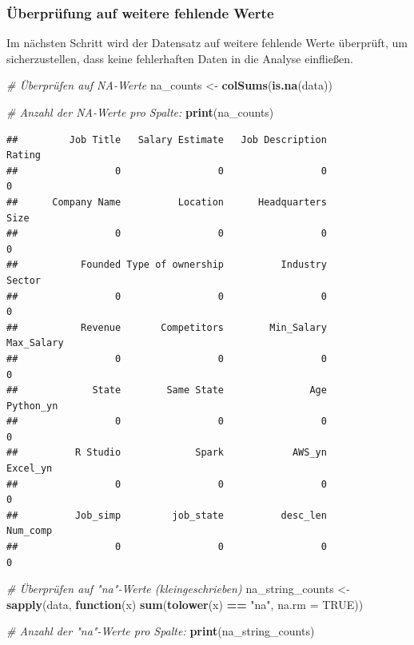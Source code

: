 \documentclass[
]{article}
\newenvironment{Shaded}{\begin{snugshade}}{\end{snugshade}}
\newcommand{\AttributeTok}[1]{\textcolor[rgb]{0.13,0.29,0.53}{#1}}
\newcommand{\CommentTok}[1]{\textcolor[rgb]{0.56,0.35,0.01}{\textit{#1}}}
\newcommand{\ConstantTok}[1]{\textcolor[rgb]{0.56,0.35,0.01}{#1}}
\newcommand{\ControlFlowTok}[1]{\textcolor[rgb]{0.13,0.29,0.53}{\textbf{#1}}}
\newcommand{\FunctionTok}[1]{\textcolor[rgb]{0.13,0.29,0.53}{\textbf{#1}}}
\newcommand{\NormalTok}[1]{#1}
\newcommand{\OtherTok}[1]{\textcolor[rgb]{0.56,0.35,0.01}{#1}}
\newcommand{\SpecialCharTok}[1]{\textcolor[rgb]{0.81,0.36,0.00}{\textbf{#1}}}
\newcommand{\StringTok}[1]{\textcolor[rgb]{0.31,0.60,0.02}{#1}}
\begin{document}
\subsubsection{Überprüfung auf weitere fehlende
Werte}\label{uxfcberpruxfcfung-auf-weitere-fehlende-werte}

Im nächsten Schritt wird der Datensatz auf weitere fehlende Werte
überprüft, um sicherzustellen, dass keine fehlerhaften Daten in die
Analyse einfließen.

\begin{Shaded}
\begin{Highlighting}[]
\CommentTok{\# Überprüfen auf NA{-}Werte}
\NormalTok{na\_counts }\OtherTok{\textless{}{-}} \FunctionTok{colSums}\NormalTok{(}\FunctionTok{is.na}\NormalTok{(data))}

\CommentTok{\# Anzahl der NA{-}Werte pro Spalte:}
\FunctionTok{print}\NormalTok{(na\_counts)}
\end{Highlighting}
\end{Shaded}

\begin{verbatim}
##         Job Title   Salary Estimate   Job Description            Rating 
##                 0                 0                 0                 0 
##      Company Name          Location      Headquarters              Size 
##                 0                 0                 0                 0 
##           Founded Type of ownership          Industry            Sector 
##                 0                 0                 0                 0 
##           Revenue       Competitors        Min_Salary        Max_Salary 
##                 0                 0                 0                 0 
##             State        Same State               Age         Python_yn 
##                 0                 0                 0                 0 
##          R Studio             Spark            AWS_yn          Excel_yn 
##                 0                 0                 0                 0 
##          Job_simp         job_state          desc_len          Num_comp 
##                 0                 0                 0                 0
\end{verbatim}

\begin{Shaded}
\begin{Highlighting}[]
\CommentTok{\# Überprüfen auf "na"{-}Werte (kleingeschrieben)}
\NormalTok{na\_string\_counts }\OtherTok{\textless{}{-}} \FunctionTok{sapply}\NormalTok{(data, }\ControlFlowTok{function}\NormalTok{(x) }\FunctionTok{sum}\NormalTok{(}\FunctionTok{tolower}\NormalTok{(x) }\SpecialCharTok{==} \StringTok{"na"}\NormalTok{, }\AttributeTok{na.rm =} \ConstantTok{TRUE}\NormalTok{))}

\CommentTok{\# Anzahl der "na"{-}Werte pro Spalte:}
\FunctionTok{print}\NormalTok{(na\_string\_counts)}
\end{Highlighting}
\end{Shaded}
\end{document}

